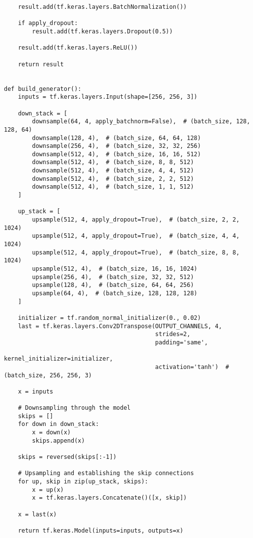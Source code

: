 \begin{lstlisting}
    result.add(tf.keras.layers.BatchNormalization())

    if apply_dropout:
        result.add(tf.keras.layers.Dropout(0.5))

    result.add(tf.keras.layers.ReLU())

    return result


def build_generator():
    inputs = tf.keras.layers.Input(shape=[256, 256, 3])

    down_stack = [
        downsample(64, 4, apply_batchnorm=False),  # (batch_size, 128, 128, 64)
        downsample(128, 4),  # (batch_size, 64, 64, 128)
        downsample(256, 4),  # (batch_size, 32, 32, 256)
        downsample(512, 4),  # (batch_size, 16, 16, 512)
        downsample(512, 4),  # (batch_size, 8, 8, 512)
        downsample(512, 4),  # (batch_size, 4, 4, 512)
        downsample(512, 4),  # (batch_size, 2, 2, 512)
        downsample(512, 4),  # (batch_size, 1, 1, 512)
    ]

    up_stack = [
        upsample(512, 4, apply_dropout=True),  # (batch_size, 2, 2, 1024)
        upsample(512, 4, apply_dropout=True),  # (batch_size, 4, 4, 1024)
        upsample(512, 4, apply_dropout=True),  # (batch_size, 8, 8, 1024)
        upsample(512, 4),  # (batch_size, 16, 16, 1024)
        upsample(256, 4),  # (batch_size, 32, 32, 512)
        upsample(128, 4),  # (batch_size, 64, 64, 256)
        upsample(64, 4),  # (batch_size, 128, 128, 128)
    ]

    initializer = tf.random_normal_initializer(0., 0.02)
    last = tf.keras.layers.Conv2DTranspose(OUTPUT_CHANNELS, 4,
                                           strides=2,
                                           padding='same',
                                           kernel_initializer=initializer,
                                           activation='tanh')  # (batch_size, 256, 256, 3)

    x = inputs

    # Downsampling through the model
    skips = []
    for down in down_stack:
        x = down(x)
        skips.append(x)

    skips = reversed(skips[:-1])

    # Upsampling and establishing the skip connections
    for up, skip in zip(up_stack, skips):
        x = up(x)
        x = tf.keras.layers.Concatenate()([x, skip])

    x = last(x)

    return tf.keras.Model(inputs=inputs, outputs=x)



\end{lstlisting}
